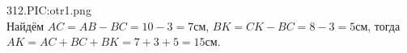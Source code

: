 312.{{PIC:otr1.png}}\\
Найдём $AC=AB-BC=10-3=7$см, $BK=CK-BC=8-3=5$см, тогда $AK=AC+BC+BK=7+3+5=15$см.\\
